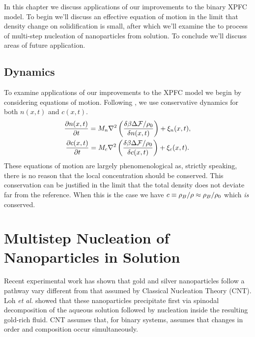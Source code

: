 \label{chapter:applications}

In this chapter we discuss applications of our improvements to the binary XPFC
model.  To begin we'll discuss an effective equation of motion in the limit
that density change on solidification is small, after which we'll examine the
to process of multi-step nucleation of nanoparticles from solution. To conclude
we'll discuss areas of future application.

\subsection{Dynamics} %

To examine applications of our improvements to the XPFC model we begin 
by considering equations of motion. Following \cite{GREENWOOD11_BINARY},
we use conservative dynamics for both $n(x, t)$ and $c(x, t)$.
%
\begin{gather}
    \frac{\partial n(x, t)}{\partial t} = 
        M_n \nabla^2\left(\frac{\delta \beta \Delta\mathcal{F} / \rho_0}{\delta n(x, t)}\right) 
        + \xi_n(x, t), \\ 
    \frac{\partial c(x, t)}{\partial t} = 
        M_c \nabla^2\left(\frac{\delta \beta \Delta \mathcal{F} / \rho_0}{\delta c(x, t)}\right)
        + \xi_c(x, t).
\end{gather}
%
These equations of motion are largely phenomenological as, strictly speaking,
there is no reason that the local concentration should be conserved.  This
conservation can be justified in the limit that the total density does not
deviate far from the reference. When this is the case we have $c \equiv \rho_B /
\rho \approx \rho_B / \rho_0$ which \textit{is} conserved.

\section{Multistep Nucleation of Nanoparticles in Solution} %

Recent experimental work has shown that gold and silver nanoparticles follow
a pathway vary different from that assumed by Classical Nucleation Theory (CNT).
Loh \textit{et al.} showed that these nanoparticles precipitate first via 
spinodal decomposition of the aqueous solution followed by nucleation inside
the resulting gold-rich fluid. CNT assumes that, for binary systems, assumes
that changes in order and composition occur simultaneously.

